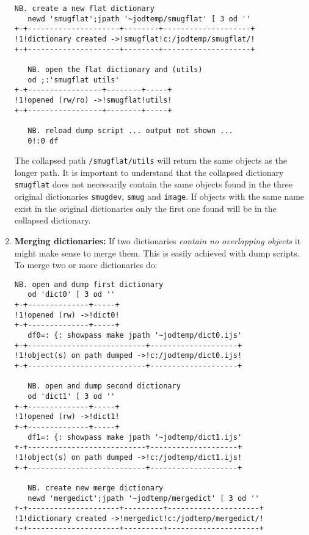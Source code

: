 \begin{enumerate}
\begin{lstlisting}[language=jdoc, frame=single,framerule=0pt,label=lst:scr5077X2]
   NB. create a new flat dictionary   
   newd 'smugflat';jpath '~jodtemp/smugflat' [ 3 od ''
+-+---------------------+--------+--------------------+
!1!dictionary created ->!smugflat!c:/jodtemp/smugflat/!
+-+---------------------+--------+--------------------+

   NB. open the flat dictionary and (utils)   
   od ;:'smugflat utils'
+-+-----------------+--------+-----+
!1!opened (rw/ro) ->!smugflat!utils!
+-+-----------------+--------+-----+

   NB. reload dump script ... output not shown ...     
   0!:0 df
\end{lstlisting}

  The collapsed path \texttt{/smugflat/utils} will return the same
  objects as the longer path. It is important to understand that the
  collapsed dictionary \texttt{smugflat} does not necessarily contain
  the same objects found in the three original dictionaries
  \texttt{smugdev}, \texttt{smug} and \texttt{image}. If objects with
  the same name exist in the original dictionaries only the first one
  found will be in the collapsed dictionary.
\item
  \textbf{Merging dictionaries:} If two dictionaries \emph{contain no
  overlapping objects} it might make sense to merge them. This is easily
  achieved with dump scripts. To merge two or more dictionaries do:

\begin{lstlisting}[language=jdoc, frame=single,framerule=0pt,label=lst:scr5077X3]
   NB. open and dump first dictionary   
   od 'dict0' [ 3 od ''
+-+--------------+-----+
!1!opened (rw) ->!dict0!
+-+--------------+-----+   
   df0=: {: showpass make jpath '~jodtemp/dict0.ijs'
+-+---------------------------+--------------------+
!1!object(s) on path dumped ->!c:/jodtemp/dict0.ijs!
+-+---------------------------+--------------------+

   NB. open and dump second dictionary   
   od 'dict1' [ 3 od ''
+-+--------------+-----+
!1!opened (rw) ->!dict1!
+-+--------------+-----+   
   df1=: {: showpass make jpath '~jodtemp/dict1.ijs'
+-+---------------------------+--------------------+
!1!object(s) on path dumped ->!c:/jodtemp/dict1.ijs!
+-+---------------------------+--------------------+

   NB. create new merge dictionary   
   newd 'mergedict';jpath '~jodtemp/mergedict' [ 3 od ''
+-+---------------------+---------+---------------------+
!1!dictionary created ->!mergedict!c:/jodtemp/mergedict/!
+-+---------------------+---------+---------------------+


\end{lstlisting}
\end{enumerate}
